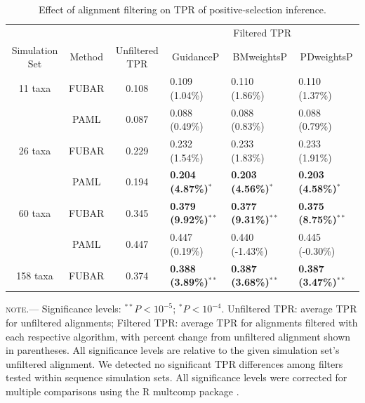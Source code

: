 \documentclass[11pt]{article}
\begin{document}
\begin{table}
\caption {\label{tab:casemodel} Effect of alignment filtering on TPR of positive-selection inference.}
\begin{tabular}{c c c l l l}
\hline\noalign{\smallskip}
& & & \multicolumn{3}{c}{Filtered TPR} \\
\cline{4-6}\noalign{\smallskip}
Simulation Set & Method & Unfiltered TPR & \multicolumn{1}{c}{GuidanceP} & \multicolumn{1}{c}{BMweightsP} & \multicolumn{1}{c}{PDweightsP} \\ 
\hline\noalign{\smallskip}
11 taxa  & FUBAR & 0.108 & 0.109  (1.04\%)   & 0.110  (1.86\%)  & 0.110  (1.37\%)        \\
              & PAML &  0.087 & 0.088  (0.49\%) &  0.088  (0.83\%)   & 0.088  (0.79\%)        \\
\hline
26 taxa   & FUBAR &  0.229 & 0.232 (1.54\%)  & 0.233 (1.83\%) & 0.233 (1.91\%)         \\
              & PAML & 0.194 & \textbf{0.204 (4.87\%)}$^{\ast}$ & \textbf{0.203 (4.56\%)}$^{\ast}$ & \textbf{0.203 (4.58\%)}$^{\ast}$   \\
\hline
60 taxa  & FUBAR & 0.345 & \textbf{0.379 (9.92\%)}$^{\ast\ast}$ & \textbf{0.377 (9.31\%)}$^{\ast\ast}$ & \textbf{0.375 (8.75\%)}$^{\ast\ast}$  \\
              & PAML & 0.447 & 0.447 (0.19\%) & 0.440 (-1.43\%) & 0.445 (-0.30\%) \\
\hline
158 taxa & FUBAR & 0.374 & \textbf{0.388 (3.89\%)}$^{\ast\ast}$ & \textbf{0.387 (3.68\%)}$^{\ast\ast}$ & \textbf{0.387 (3.47\%)}$^{\ast\ast}$  \\
\hline
\end{tabular}
\newline
\textsc{note.}--- Significance levels: $^{\ast\ast} P < 10^{-5}$; $^{\ast} P < 10^{-4}$. Unfiltered TPR: average TPR for unfiltered alignments; Filtered TPR: average TPR for alignments filtered with each respective algorithm, with percent change from unfiltered alignment shown in parentheses. All significance levels are relative to the given simulation set's unfiltered alignment. We detected no significant TPR differences among filters tested within sequence simulation sets. All significance levels were corrected for multiple comparisons using the R multcomp package \citep{Hothorn2008}.
\end{table}

\bigskip
\end{document}
